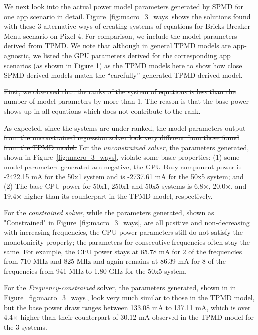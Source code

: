We next look into the actual power model parameters generated by SPMD
for one app scenario in detail.
Figure~\ref{fig:macro_3_ways} shows
the solutions found with these 3 alternative ways of creating systems of
equations for Bricks Breaker Menu scenario on Pixel 4.
For comparison, we include the model parameters derived from
TPMD. We note
that although in general TPMD models are app-agnostic, we listed the
GPU parameters derived for the corresponding app scenarios (as shown
in Figure 1) as the TPMD models here to show how close SPMD-derived
models match the ``carefully'' generated TPMD-derived model.

\st{First, we observed that the ranks of the system of equations is less
than the number of model parameters by more than 1.  The reason is
that the base power shows up in all equations which does not
contribute to the rank.}

\st{As expected, since the systems are under-ranked, the model parameters
output from the unconstrained regression solver look very different
from those found from the TPMD model.}
For the {\it unconstrained solver},
the parameters generated, shown in Figure~\ref{fig:macro_3_ways},
violate some basic properties:
(1) some model parameters generated are negative, \eg the GPU Busy
component power is -2422.15 mA for the 50x1 system  and
is -2737.61 mA for the 50x5 system; and 
(2) The base CPU power for 50x1, 250x1 and 50x5 systems 
is 6.8$\times$, 20.0$\times$, and 19.4$\times$ higher 
than its counterpart in the TPMD model, respectively.

For the {\it constrained solver}, while the parameters generated,
shown as "Constrained" in Figure~\ref{fig:macro_3_ways}, are all
positive and non-decreasing with increasing frequencies, the
CPU power parameters still do not satisfy the monotonicity property;
the parameters for consecutive frequencies often stay the same. 
For example, 
the CPU power stays at
65.78 mA for 2 of the frequencies from 710 MHz and 825 MHz and again
remains at 86.39 mA for 8 of the frequencies from 941 MHz to 1.80 GHz
for the 50x5 system.

For the {\em Frequency-constrained} solver, the parameters generated, shown in
in Figure~\ref{fig:macro_3_ways}, look very much similar to those in
the TPMD model, but the base power draw ranges between 133.08 mA to
137.11 mA, which is over 4.4$\times$ higher than their counterpart of
30.12 mA observed in the TPMD model for the 3 systems.

